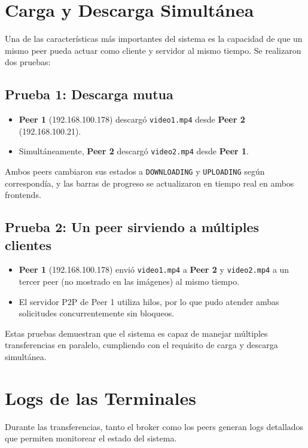 \documentclass[12pt]{article}
\begin{document}
\section{Carga y Descarga Simultánea}

Una de las características más importantes del sistema es la capacidad de que un mismo peer pueda actuar como cliente y servidor al mismo tiempo. Se realizaron dos pruebas:

\subsection{Prueba 1: Descarga mutua}
\begin{itemize}
    \item \textbf{Peer 1} (192.168.100.178) descargó \texttt{video1.mp4} desde \textbf{Peer 2} (192.168.100.21).
    \item Simultáneamente, \textbf{Peer 2} descargó \texttt{video2.mp4} desde \textbf{Peer 1}.
\end{itemize}
Ambos peers cambiaron sus estados a \texttt{DOWNLOADING} y \texttt{UPLOADING} según correspondía, y las barras de progreso se actualizaron en tiempo real en ambos frontends.

\subsection{Prueba 2: Un peer sirviendo a múltiples clientes}
\begin{itemize}
    \item \textbf{Peer 1} (192.168.100.178) envió \texttt{video1.mp4} a \textbf{Peer 2} y \texttt{video2.mp4} a un tercer peer (no mostrado en las imágenes) al mismo tiempo.
    \item El servidor P2P de Peer 1 utiliza hilos, por lo que pudo atender ambas solicitudes concurrentemente sin bloqueos.
\end{itemize}

Estas pruebas demuestran que el sistema es capaz de manejar múltiples transferencias en paralelo, cumpliendo con el requisito de carga y descarga simultánea.

\section{Logs de las Terminales}

Durante las transferencias, tanto el broker como los peers generan logs detallados que permiten monitorear el estado del sistema.
\end{document}
